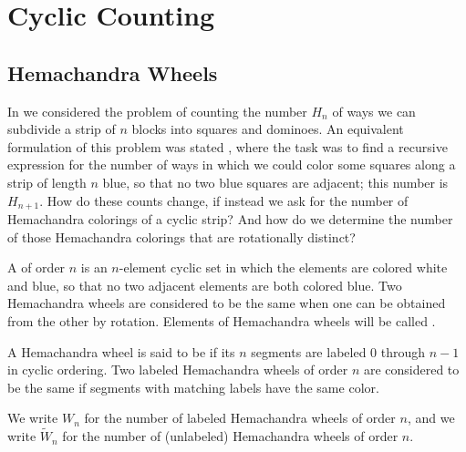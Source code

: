 \chapter{Cyclic Counting}

\section{Hemachandra Wheels}

In  we considered the problem of counting the number $H_n$ of ways we can subdivide a strip of $n$ blocks into squares and dominoes. An equivalent formulation of this problem was stated , where the task was to find a recursive expression for the number of ways in which we could color some squares along a strip of length $n$ blue, so that no two blue squares are adjacent; this number is $H_{n+1}$. How do these counts change, if instead we ask for the number of Hemachandra colorings of a cyclic strip? And how do we determine the number of those Hemachandra colorings that are rotationally distinct?

\begin{definition}
  A  of order $n$ is an $n$-element cyclic set in which the elements are colored white and blue, so that no two adjacent elements are both colored blue. Two Hemachandra wheels are considered to be the same when one can be obtained from the other by rotation. Elements of Hemachandra wheels will be called .

  A Hemachandra wheel is said to be  if its $n$ segments are labeled $0$ through $n-1$ in cyclic ordering. Two labeled Hemachandra wheels of order $n$ are considered to be the same if segments with matching labels have the same color.

  We write $W_n$ for the number of labeled Hemachandra wheels of order $n$, and we write $\tilde{W}_n$ for the number of (unlabeled) Hemachandra wheels of order $n$.
\end{definition}


